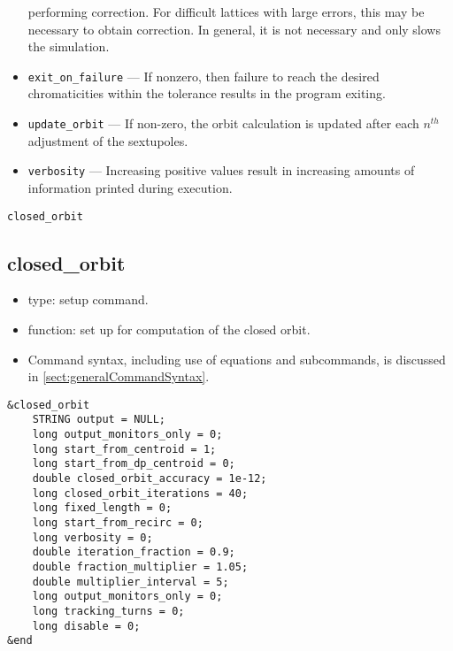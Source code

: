 \documentclass[11pt]{article}
\begin{document}
\begin{itemize}
performing correction.  For difficult lattices with large errors, this may be necessary
to obtain correction.  In general, it is not necessary and only slows the simulation.
\item \verb|exit_on_failure| --- If nonzero, then failure to reach the desired chromaticities within the
  tolerance results in the program exiting.
\item \verb|update_orbit| --- If non-zero, the orbit calculation is updated after each $n^{th}$ adjustment of the
  sextupoles.
\item \verb|verbosity| --- Increasing positive values result in increasing amounts of information printed during
  execution.
\end{itemize}

\newpage
\begin{center}{\Large\verb|closed_orbit|}\end{center}
\subsection{closed\_orbit \label{subsec:closedorbit}}

\begin{itemize}
\item type: setup command.
\item function: set up for computation of the closed orbit.
\item Command syntax, including use of equations and subcommands, is discussed in \ref{sect:generalCommandSyntax}.
\end{itemize}

\begin{verbatim}
&closed_orbit
    STRING output = NULL;
    long output_monitors_only = 0;
    long start_from_centroid = 1;
    long start_from_dp_centroid = 0;
    double closed_orbit_accuracy = 1e-12;
    long closed_orbit_iterations = 40;
    long fixed_length = 0;
    long start_from_recirc = 0;
    long verbosity = 0;
    double iteration_fraction = 0.9;
    double fraction_multiplier = 1.05;
    double multiplier_interval = 5;
    long output_monitors_only = 0;
    long tracking_turns = 0;
    long disable = 0;
&end
\end{verbatim}
\end{document}
